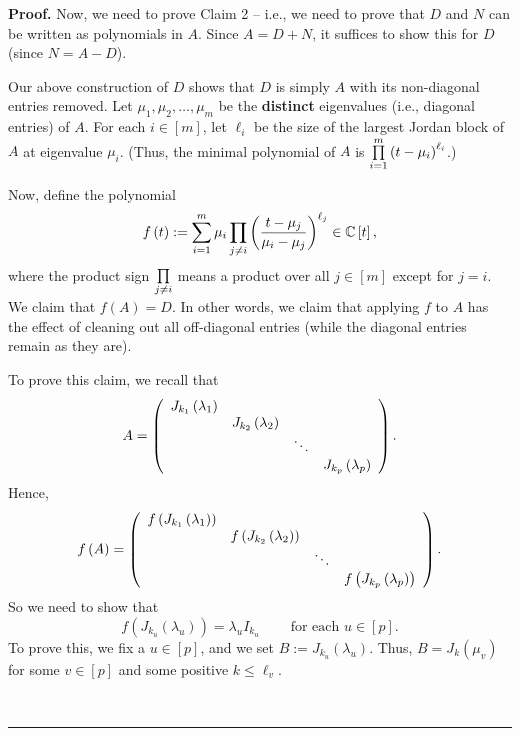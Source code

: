 \documentclass[numbers=enddot,12pt,final,onecolumn,notitlepage]{scrartcl}%
\numberwithin{exer}{subsection}
\theoremstyle{definition}
\newenvironment{proof}[1][Proof]{\noindent\textbf{#1.} }{\ \rule{0.5em}{0.5em}}
\let\sumnonlimits\sum
\let\prodnonlimits\prod
\renewcommand{\sum}{\sumnonlimits\limits}
\renewcommand{\prod}{\prodnonlimits\limits}
\begin{document}
\begin{proof}
Now, we need to prove Claim 2 -- i.e., we need to prove that $D$ and $N$ can
be written as polynomials in $A$. Since $A=D+N$, it suffices to show this for
$D$ (since $N=A-D$).

Our above construction of $D$ shows that $D$ is simply $A$ with its
non-diagonal entries removed. Let $\mu_{1},\mu_{2},\ldots,\mu_{m}$ be the
\textbf{distinct} eigenvalues (i.e., diagonal entries) of $A$. For each
$i\in\left[  m\right]  $, let $\ell_{i}$ be the size of the largest Jordan
block of $A$ at eigenvalue $\mu_{i}$. (Thus, the minimal polynomial of $A$ is
$\prod\limits_{i=1}^{m}\left(  t-\mu_{i}\right)  ^{\ell_{i}}$.)

Now, define the polynomial%
\[
f\left(  t\right)  :=\sum_{i=1}^{m}\mu_{i}\prod\limits_{j\neq i}\left(
\dfrac{t-\mu_{j}}{\mu_{i}-\mu_{j}}\right)  ^{\ell_{j}}\in\mathbb{C}\left[
t\right]  ,
\]
where the product sign $\prod\limits_{j\neq i}$ means a product over all
$j\in\left[  m\right]  $ except for $j=i$. We claim that $f\left(  A\right)
=D$. In other words, we claim that applying $f$ to $A$ has the effect of
cleaning out all off-diagonal entries (while the diagonal entries remain as
they are).

To prove this claim, we recall that%
\[
A=\left(
\begin{array}
[c]{cccc}%
J_{k_{1}}\left(  \lambda_{1}\right)  &  &  & \\
& J_{k_{2}}\left(  \lambda_{2}\right)  &  & \\
&  & \ddots & \\
&  &  & J_{k_{p}}\left(  \lambda_{p}\right)
\end{array}
\right)  .
\]
Hence,%
\[
f\left(  A\right)  =\left(
\begin{array}
[c]{cccc}%
f\left(  J_{k_{1}}\left(  \lambda_{1}\right)  \right)  &  &  & \\
& f\left(  J_{k_{2}}\left(  \lambda_{2}\right)  \right)  &  & \\
&  & \ddots & \\
&  &  & f\left(  J_{k_{p}}\left(  \lambda_{p}\right)  \right)
\end{array}
\right)  .
\]
So we need to show that%
\[
f\left(  J_{k_{u}}\left(  \lambda_{u}\right)  \right)  =\lambda_{u}I_{k_{u}%
}\ \ \ \ \ \ \ \ \ \ \text{for each }u\in\left[  p\right]  .
\]
To prove this, we fix a $u\in\left[  p\right]  $, and we set $B:=J_{k_{u}%
}\left(  \lambda_{u}\right)  $. Thus, $B=J_{k}\left(  \mu_{v}\right)  $ for
some $v\in\left[  p\right]  $ and some positive $k\leq\ell_{v}$.


\end{proof}
\end{document}
